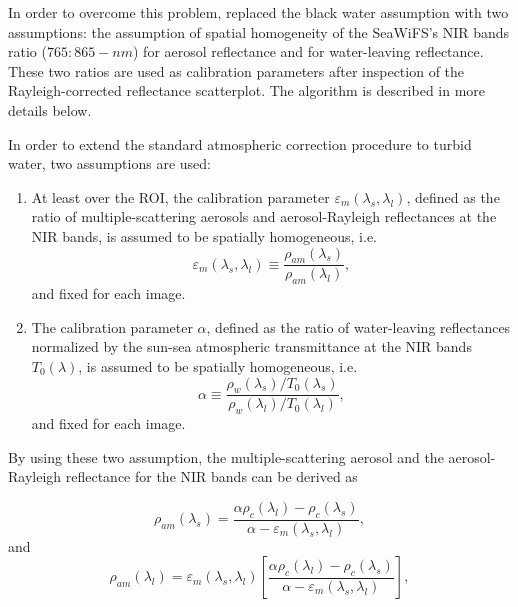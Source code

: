In order to overcome this problem, \cite{Ruddick:2000bs} replaced the black water assumption with two assumptions: the assumption of spatial homogeneity of the SeaWiFS's NIR bands ratio ($765:865-nm$) for aerosol reflectance and for water-leaving reflectance. These two ratios are used as calibration parameters after inspection of the Rayleigh-corrected reflectance scatterplot. The algorithm is described in more details below.

In order to extend the standard atmospheric correction procedure to turbid water, two assumptions are used:

\begin{enumerate}[itemsep=2pt,parsep=2pt]
  \item At least over the ROI, the calibration parameter $\varepsilon_m(\lambda_s,\lambda_l)$, defined as the ratio of multiple-scattering aerosols and aerosol-Rayleigh reflectances at the NIR bands, is assumed to be spatially homogeneous, i.e.
  \begin{equation}\label{eq:rhohomo}
    \varepsilon_m(\lambda_s,\lambda_l)\equiv \frac{\rho_{am}(\lambda_s)}{\rho_{am}(\lambda_l)},
  \end{equation}
  and fixed for each image.

  \item The calibration parameter $\alpha$, defined as the ratio of water-leaving reflectances normalized by the sun-sea atmospheric transmittance at the NIR bands $T_0(\lambda)$, is assumed to be spatially homogeneous, i.e.
  \begin{equation}\label{eq:alpha}
    \alpha \equiv \frac{\rho_w(\lambda_s)/T_0(\lambda_s)}{\rho_w(\lambda_l)/T_0(\lambda_l)},
  \end{equation}
  and fixed for each image.
\end{enumerate}

By using these two assumption, the multiple-scattering aerosol and the aerosol-Rayleigh reflectance for the NIR bands can be derived as

\begin{equation}\label{eq:rhoams}
  \rho_{am}(\lambda_s) = \frac{\alpha\rho_c(\lambda_l)-\rho_c(\lambda_s)}{\alpha-\varepsilon_m(\lambda_s,\lambda_l)},
\end{equation}
and
\begin{equation}\label{eq:rhoaml}
  \rho_{am}(\lambda_l) = \varepsilon_m(\lambda_s,\lambda_l)\left[\frac{\alpha\rho_c(\lambda_l)-\rho_c(\lambda_s)}{\alpha-\varepsilon_m(\lambda_s,\lambda_l)}\right],
\end{equation}

